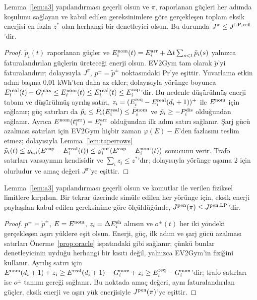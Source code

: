 \begin{proposition}\label{prop:oracle}
Lemma~\ref{lem:a3} yapılandırması geçerli olsun ve $\pi$, raporlanan güçleri her adımda  koşulunu sağlayan ve kabul edilen gereksinimlere göre gerçekleşen toplam eksik enerjisi en fazla $z^{*}$ olan herhangi bir denetleyici olsun.
Bu durumda $J^{\pi}\le J^{\mathrm{LP,ceil}}$'dir.
\end{proposition}

\begin{proof}
$\tilde p_i(t)$ raporlanan güçler ve $E_i^{\mathrm{nom}}(t)=E_i^{\mathrm{arr}}+\Delta t\sum_{s<t}\tilde p_i(s)$ yalnızca faturalandırılan güçlerin üreteceği enerji olsun.
EV2Gym tam olarak $\tilde p$'yi faturalandırır; dolayısıyla $J^{\pi}$, $p^{\pm}=\tilde p^{\pm}$ noktasındaki $\mathrm{Pr}$'ye eşittir.
Yuvarlama etkin adım başına 0,01 kWh'ten daha az ekler; dolayısıyla yörünge boyunca $E_i^{\mathrm{real}}(t)-G_i^{\max}\le E_i^{\mathrm{nom}}(t)\le E_i^{\mathrm{real}}(t)\le E_i^{\mathrm{cap}}$'dir.
Bu nedenle düşürülmüş enerji tabanı ve düşürülmüş ayrılış satırı, $z_i=(E^{\mathrm{req}}_i-E_i^{\mathrm{real}}(d_i+1))^{+}$ ile $E^{\mathrm{nom}}$ için sağlanır; güç satırları da $\tilde p_i\le\bar P_i(E_i^{\mathrm{real}})\le\bar P^{\mathrm{nom}}_i$ ve $\tilde p_i\ge-P^{\mathrm{dis}}_i$ olduğundan sağlanır.
Ayrıca $E^{\mathrm{nom}}(t_i^{\mathrm{arr}})=E_i^{\mathrm{arr}}$ olduğundan ilk adım satırı sağlanır.
Şarj gücü azalması satırları için EV2Gym hiçbir zaman $\varphi(E)-E$'den fazlasını teslim etmez; dolayısıyla Lemma~\ref{lem:taperrows} $\tilde p_i(t)\le\varrho_{\kappa,i}(E^{\mathrm{cap}}-E_i^{\mathrm{real}}(t))\le\varrho_i^{\mathrm{out}}(E^{\mathrm{cap}}-E_i^{\mathrm{nom}}(t))$ sonucunu verir.
Trafo satırları varsayımın kendisidir ve $\sum_iz_i\le z^{*}$'dır; dolayısıyla yörünge aşama 2 için olurludur ve amaç değeri $J^{\pi}$'ye eşittir.
\end{proof}

\begin{proposition}\label{prop:softoracle}
Lemma~\ref{lem:a3} yapılandırması geçerli olsun ve komutlar  ile verilen fiziksel limitlere kırpılsın.
Bir tekrar üzerinde simüle edilen her yörünge için, eksik enerji paylaşılan kabul edilen gereksinime göre ölçüldüğünde, $J^{\mathrm{pen}}(\pi)\le J^{\mathrm{pen,LP}}$'dir.
\end{proposition}

\begin{proof}
$p^{\pm}=\tilde p^{\pm}$, $E=E^{\mathrm{nom}}$, $z_i=\Delta E_i^{\mathrm{sh}}$ alınsın ve $o^{\pm}(t)$ her iki yöndeki gerçekleşen aşırı yüklere eşit olsun.
Enerji, güç, ilk adım ve şarj gücü azalması satırları Önerme~\ref{prop:oracle} ispatındaki gibi sağlanır; çünkü bunlar denetleyicinin uyduğu herhangi bir kısıtı değil, yalnızca EV2Gym'in fiziğini kullanır.
Ayrılış satırı için $E^{\mathrm{nom}}(d_i+1)+z_i\ge E^{\mathrm{real}}(d_i+1)-G_i^{\max}+z_i\ge E^{\mathrm{req}}_i-G_i^{\max}$'dir; trafo satırları ise $o^{\pm}$ tanımı gereği sağlanır.
Bu noktada amaç değeri, aynı faturalandırılan güçler, eksik enerji ve aşırı yük enerjisiyle $J^{\mathrm{pen}}(\pi)$'ye eşittir.
\end{proof}

